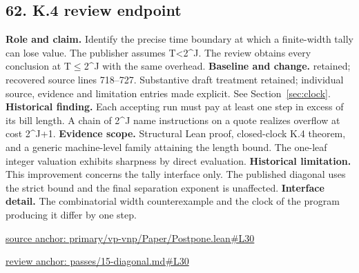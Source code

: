 \documentclass[11pt,letterpaper]{article}
\theoremstyle{definition}\newtheorem{definition}[theorem]{Definition}\newtheorem{example}[theorem]{Example}
\theoremstyle{remark}\newtheorem{remark}[theorem]{Remark}
\begin{document}
\subsection*{62. K.4 review endpoint}
\textbf{Role and claim.} Identify the precise time boundary at which a finite-width tally can lose value. The publisher assumes T<2\textasciicircum{}J. The review obtains every conclusion at T\ensuremath{\le}2\textasciicircum{}J with the same overhead.
\textbf{Baseline and change.} retained; recovered source lines 718--727. Substantive draft treatment retained; individual source, evidence and limitation entries made explicit. See Section~\ref{sec:clock}.
\textbf{Historical finding.} Each accepting run must pay at least one step in excess of its bill length. A chain of 2\textasciicircum{}J name instructions on a quote realizes overflow at cost 2\textasciicircum{}J+1.
\textbf{Evidence scope.} Structural Lean proof, closed-clock K.4 theorem, and a generic machine-level family attaining the length bound. The one-leaf integer valuation exhibits sharpness by direct evaluation.
\textbf{Historical limitation.} This improvement concerns the tally interface only. The published diagonal uses the strict bound and the final separation exponent is unaffected.
\textbf{Interface detail.} The combinatorial width counterexample and the clock of the program producing it differ by one step.
\par\href{https://github.com/nousentllc/VP-VNP-Review/blob/8a7976933b6b2b4ffda1ad3a0dfb5fc6b6f023e8/primary/vp-vnp/Paper/Postpone.lean\#L30}{source anchor: primary/vp-vnp/Paper/Postpone.lean\#L30}
\par\href{https://github.com/nousentllc/VP-VNP-Review/blob/8a7976933b6b2b4ffda1ad3a0dfb5fc6b6f023e8/passes/15-diagonal.md\#L30}{review anchor: passes/15-diagonal.md\#L30}
\goodbreak
\end{document}
